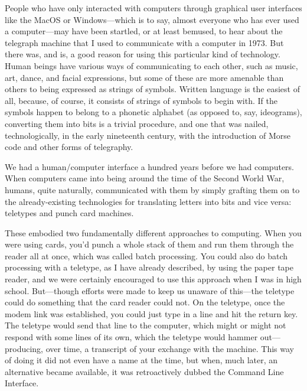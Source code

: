 \documentclass[
  fontsize=11pt,
  paper=landscape,
  twocolumn=true,
  pagesize=pdftex,
  headings=small,
  DIV=15,
  ]{scrartcl}
\begin{document}
People who have only interacted with computers through graphical user
interfaces like the MacOS or Windows---which is to say, almost everyone
who has ever used a computer---may have been startled, or at least
bemused, to hear about the telegraph machine that I used to communicate
with a computer in 1973. But there was, and is, a good reason for using
this particular kind of technology. Human beings have various ways of
communicating to each other, such as music, art, dance, and facial
expressions, but some of these are more amenable than others to being
expressed as strings of symbols. Written language is the easiest of all,
because, of course, it consists of strings of symbols to begin with. If
the symbols happen to belong to a phonetic alphabet (as opposed to, say,
ideograms), converting them into bits is a trivial procedure, and one
that was nailed, technologically, in the early nineteenth century, with
the introduction of Morse code and other forms of telegraphy.

We had a human/computer interface a hundred years before we had
computers. When computers came into being around the time of the Second
World War, humans, quite naturally, communicated with them by simply
grafting them on to the already-existing technologies for translating
letters into bits and vice versa: teletypes and punch card machines.

These embodied two fundamentally different approaches to computing. When
you were using cards, you'd punch a whole stack of them and run them
through the reader all at once, which was called batch processing. You
could also do batch processing with a teletype, as I have already
described, by using the paper tape reader, and we were certainly
encouraged to use this approach when I was in high school. But---though
efforts were made to keep us unaware of this---the teletype could do
something that the card reader could not. On the teletype, once the
modem link was established, you could just type in a line and hit the
return key. The teletype would send that line to the computer, which
might or might not respond with some lines of its own, which the
teletype would hammer out---producing, over time, a transcript of your
exchange with the machine. This way of doing it did not even have a name
at the time, but when, much later, an alternative became available, it
was retroactively dubbed the Command Line Interface.
\end{document}

